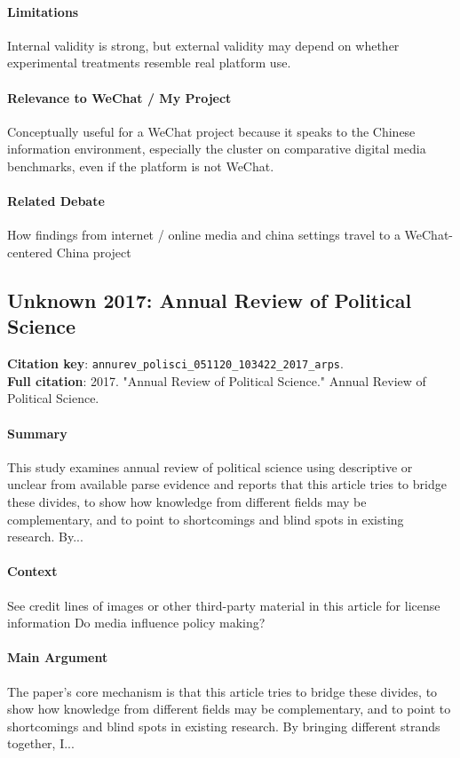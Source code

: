 \documentclass[12pt]{article}
\begin{document}
\paragraph{Limitations} Internal validity is strong, but external validity may depend on whether experimental treatments resemble real platform use.

\paragraph{Relevance to WeChat / My Project} Conceptually useful for a WeChat project because it speaks to the Chinese information environment, especially the cluster on comparative digital media benchmarks, even if the platform is not WeChat.

\paragraph{Related Debate} How findings from internet / online media and china settings travel to a WeChat-centered China project


\subsection{Unknown 2017: Annual Review of Political Science}
\textbf{Citation key}: \texttt{annurev\_polisci\_051120\_103422\_2017\_arps}.\\
\textbf{Full citation}: 2017. "Annual Review of Political Science." Annual Review of Political Science.

\paragraph{Summary} This study examines annual review of political science using descriptive or unclear from available parse evidence and reports that this article tries to bridge these divides, to show how knowledge from different fields may be complementary, and to point to shortcomings and blind spots in existing research. By...

\paragraph{Context} See credit lines of images or other third-party material in this article for license information Do media influence policy making?

\paragraph{Main Argument} The paper's core mechanism is that this article tries to bridge these divides, to show how knowledge from different fields may be complementary, and to point to shortcomings and blind spots in existing research. By bringing different strands together, I...
\end{document}

